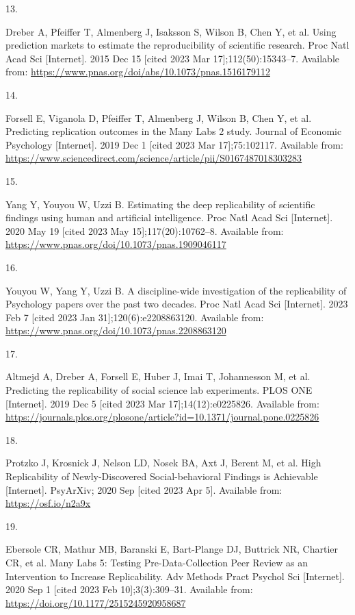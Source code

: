 \documentclass[
  english,
  a4paper,
]{article}
\newlength{\cslhangindent}
\newlength{\csllabelwidth}
\newlength{\cslentryspacingunit} %
\newenvironment{CSLReferences}[2] %
 {%
  \setlength{\parindent}{0pt}
  \ifodd #1
  \let\oldpar\par
  \def\par{\hangindent=\cslhangindent\oldpar}
  \fi
  \setlength{\parskip}{#2\cslentryspacingunit}
 }%
 {}
\newcommand{\CSLLeftMargin}[1]{\parbox[t]{\csllabelwidth}{#1}}
\newcommand{\CSLRightInline}[1]{\parbox[t]{\linewidth - \csllabelwidth}{#1}\break}
\begin{document}
\begin{CSLReferences}{0}{0}
\leavevmode{}%
\CSLLeftMargin{13. }%
\CSLRightInline{Dreber A, Pfeiffer T, Almenberg J, Isaksson S, Wilson B, Chen Y, et al. Using prediction markets to estimate the reproducibility of scientific research. Proc Natl Acad Sci {[}Internet{]}. 2015 Dec 15 {[}cited 2023 Mar 17{]};112(50):15343--7. Available from: \url{https://www.pnas.org/doi/abs/10.1073/pnas.1516179112}}

\leavevmode{}%
\CSLLeftMargin{14. }%
\CSLRightInline{Forsell E, Viganola D, Pfeiffer T, Almenberg J, Wilson B, Chen Y, et al. Predicting replication outcomes in the {Many Labs} 2 study. Journal of Economic Psychology {[}Internet{]}. 2019 Dec 1 {[}cited 2023 Mar 17{]};75:102117. Available from: \url{https://www.sciencedirect.com/science/article/pii/S0167487018303283}}

\leavevmode{}%
\CSLLeftMargin{15. }%
\CSLRightInline{Yang Y, Youyou W, Uzzi B. Estimating the deep replicability of scientific findings using human and artificial intelligence. Proc Natl Acad Sci {[}Internet{]}. 2020 May 19 {[}cited 2023 May 15{]};117(20):10762--8. Available from: \url{https://www.pnas.org/doi/10.1073/pnas.1909046117}}

\leavevmode{}%
\CSLLeftMargin{16. }%
\CSLRightInline{Youyou W, Yang Y, Uzzi B. A discipline-wide investigation of the replicability of {Psychology} papers over the past two decades. Proc Natl Acad Sci {[}Internet{]}. 2023 Feb 7 {[}cited 2023 Jan 31{]};120(6):e2208863120. Available from: \url{https://www.pnas.org/doi/10.1073/pnas.2208863120}}

\leavevmode{}%
\CSLLeftMargin{17. }%
\CSLRightInline{Altmejd A, Dreber A, Forsell E, Huber J, Imai T, Johannesson M, et al. Predicting the replicability of social science lab experiments. PLOS ONE {[}Internet{]}. 2019 Dec 5 {[}cited 2023 Mar 17{]};14(12):e0225826. Available from: \url{https://journals.plos.org/plosone/article?id=10.1371/journal.pone.0225826}}

\leavevmode{}%
\CSLLeftMargin{18. }%
\CSLRightInline{Protzko J, Krosnick J, Nelson LD, Nosek BA, Axt J, Berent M, et al. High {Replicability} of {Newly-Discovered Social-behavioral Findings} is {Achievable} {[}Internet{]}. {PsyArXiv}; 2020 Sep {[}cited 2023 Apr 5{]}. Available from: \url{https://osf.io/n2a9x}}

\leavevmode{}%
\CSLLeftMargin{19. }%
\CSLRightInline{Ebersole CR, Mathur MB, Baranski E, Bart-Plange DJ, Buttrick NR, Chartier CR, et al. Many {Labs} 5: {Testing Pre-Data-Collection Peer Review} as an {Intervention} to {Increase Replicability}. Adv Methods Pract Psychol Sci {[}Internet{]}. 2020 Sep 1 {[}cited 2023 Feb 10{]};3(3):309--31. Available from: \url{https://doi.org/10.1177/2515245920958687}}


\end{CSLReferences}
\end{document}
